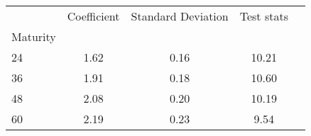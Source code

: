 \begin{tabular}{lcccc}
\toprule
{} &  Coefficient &  Standard Deviation &  Test stats \\
Maturity &              &                     &             \\
\midrule
24       &         1.62 &                0.16 &       10.21 \\
36       &         1.91 &                0.18 &       10.60 \\
48       &         2.08 &                0.20 &       10.19 \\
60       &         2.19 &                0.23 &        9.54 \\
\bottomrule
\end{tabular}
